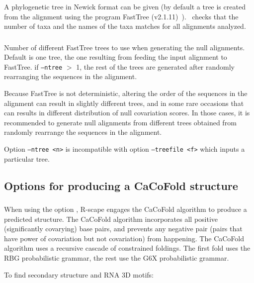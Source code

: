 \subsubsection{} A phylogenetic tree in Newick format can be given (by default a tree is created 
from the alignment using the program FastTree (v2.1.11)~\citep{Price10}).  \rscape\ checks that the  number of taxa and the names
of the taxa matches for all alignments analyzed.

\subsubsection{} Number of different FastTree trees to use when generating the null alignments. Default is one tree, the one resulting from feeding the input alignment to FastTree. if \texttt{--ntree} $>$ 1, the rest of the trees are generated after randomly rearranging the sequences in the alignment.

\noindent
Because FastTree is not deterministic, altering the order of the sequences in the alignment can result in slightly different trees, and in some rare occasions that can results in different distribution of null covariation scores. In those cases, it is recommended to generate null alignments from different trees obtained from randomly rearrange the sequences in the alignment.

\noindent
Option \texttt{--ntree <n>} is incompatible with option \texttt{--treefile <f>} which inputs a particular tree.


\subsection{Options for producing a CaCoFold structure}

\subsubsection{}  
When using the option , R-scape engages the CaCoFold
algorithm to produce a predicted structure. The CaCoFold algorithm
incorporates all positive (significantly covarying) base pairs, and
prevents any negative pair (pairs that have power of covariation but
not covariation) from happening. The CaCoFold algorithm uses a
recursive cascade of constrained foldings. The first fold uses the RBG probabilistic grammar, the rest use the G6X probabilistic grammar.

\noindent
To find secondary structure and RNA 3D motifs:

